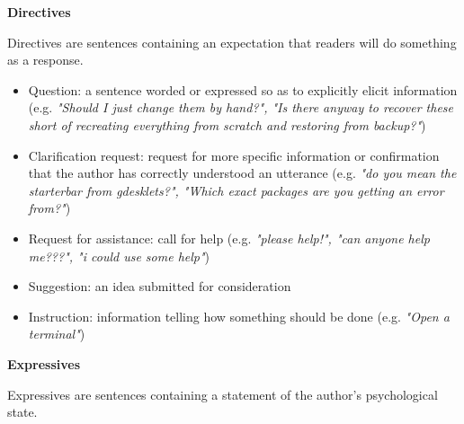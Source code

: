 \documentclass[11pt]{article}
\begin{document}
\textbf{Directives}
\vspace{0.1cm}

Directives are sentences containing an expectation that readers will do something as a response.

\begin{itemize}
	\item Question: a sentence worded or expressed so as to explicitly elicit information (e.g. \textit{"Should I just change them by hand?", "Is there anyway to recover these short of recreating everything from scratch and restoring from backup?"})
		\item Clarification request: request for more specific information or confirmation that the author has correctly understood an utterance (e.g. \textit{"do you mean the starterbar from gdesklets?", "Which exact packages are you getting an error from?"})
	\item Request for assistance: call for help (e.g. \textit{"please help!", "can anyone help me???", "i could use some help"})
	\item Suggestion: an idea submitted for consideration
	\item Instruction: information telling how something should be done (e.g. \textit{"Open a terminal"})
\end{itemize}

\textbf{Expressives}
\vspace{0.1cm}

Expressives are sentences containing a statement of the author's psychological state.
\end{document}
